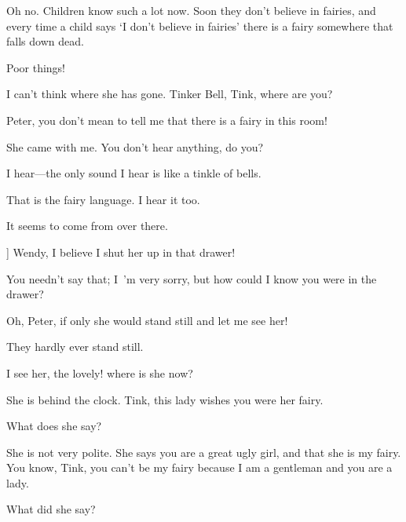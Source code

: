 \begin{drama}
\peterspeaks
Oh no.
Children know such a lot now.
Soon they don’t believe in fairies,
and every time a child says ‘I don’t believe in fairies’ there is a fairy somewhere that falls down dead.

\wendyspeaks
Poor things!

I can’t think where she has gone.
Tinker Bell, Tink, where are you?

Peter, you don’t mean to tell me that there is a fairy in this room!

She came with me.
You don’t hear anything, do you?

\wendyspeaks
I hear—the only sound I hear is like a tinkle of bells.

\peterspeaks
That is the fairy language.
I hear it too.

\wendyspeaks
It seems to come from over there.

\peterspeaks
{}]
Wendy, I believe I shut her up in that drawer!


You needn’t say that; I~’m very sorry, but how could I know you were in the drawer?

Oh, Peter, if only she would stand still and let me see her!

They hardly ever stand still.


\wendyspeaks
I see her, the lovely!
where is she now?

\peterspeaks
She is behind the clock.
Tink, this lady wishes you were her fairy.

\wendyspeaks
What does she say?

\peterspeaks
She is not very polite.
She says you are a great ugly girl, and that she is my fairy.
You know, Tink, you can’t be my fairy because I am a gentleman and you are a lady.


\wendyspeaks
What did she say?


\end{drama}
